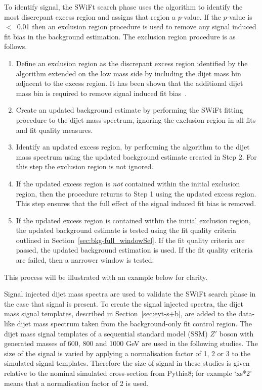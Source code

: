 To identify signal, the SWiFt search phase uses the \bh{} algorithm to identify the most discrepant excess region and assigns that region a \mbox{$p$-value}.
If the \mbox{$p$-value} is \mbox{$<$ 0.01} then an exclusion region procedure is used to remove any signal induced fit bias in the background estimation.
The exclusion region procedure is as follows.
\vspace{-0.5em}
\begin{enumerate}[leftmargin=*]
\item Define an exclusion region as the discrepant excess region identified by the \bh{} algorithm
      extended on the low mass side by including the dijet mass bin adjacent to the excess region.
      It has been shown that the additional dijet mass bin is required to remove signal induced fit bias~\cite{dijet-mori16_paper}.
      
\item Create an updated background estimate 
      by performing the SWiFt fitting procedure to the dijet mass spectrum, ignoring the exclusion region in all fits and fit quality measures.
\item Identify an updated excess region, by performing the \bh{} algorithm to the dijet mass spectrum using the updated background estimate created in Step 2.
      For this step the exclusion region is not ignored.
\item If the updated excess region is \textit{not} contained within the initial exclusion region,
      then the procedure returns to Step 1 using the updated excess region.
      This step ensures that the full effect of the signal induced fit bias is removed.
\item If the updated excess region is contained within the initial exclusion region,
      the updated background estimate is tested using the fit quality criteria outlined in Section~\ref{sec:bkg-full_windowSel}.
      If the fit quality criteria are passed, the updated background estimation is used.
      If the fit quality criteria are failed, then a narrower window is tested.
\end{enumerate}
\vspace{-0.25em}
This process will be illustrated with an example below for clarity.

Signal injected dijet mass spectra are used to validate the SWiFt search phase in the case that signal is present.
To create the signal injected spectra, the dijet mass signal templates, described in Section~\ref{sec:evt-s+b},
are added to the data-like dijet mass spectrum taken from the background-only fit control region.
The dijet mass signal templates of a sequential standard model (SSM) $Z'$ boson with generated masses of 600, 800 and 1000 GeV are used in the following studies.
The size of the signal is varied by applying a normalisation factor of 1, 2 or 3 to the simulated signal templates.
Therefore the size of signal in these studies is given relative to the nominal simulated cross-section from {\sc Pythia8};
for example `xs*2' means that a normalisation factor of 2 is used.

